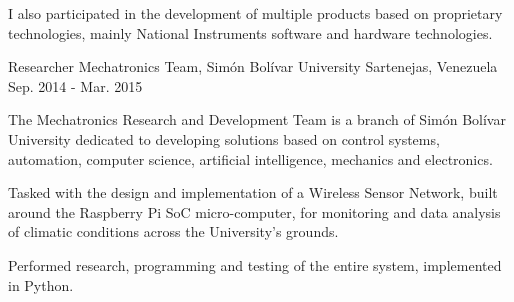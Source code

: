 \begin{cventries}
{\begin{cvitems}
        \item {I also participated in the development of multiple products based on proprietary technologies, mainly National Instruments software and hardware technologies.}
      \end{cvitems} 
    }
  \cventry
    {Researcher}
    {Mechatronics Team, Sim\'on Bol\'ivar University}
    {Sartenejas, Venezuela}
    {Sep. 2014 - Mar. 2015}
    {
    The Mechatronics Research and Development Team is a branch of Sim\'on Bol\'ivar University dedicated to developing solutions based on control systems, automation, computer science, artificial intelligence, mechanics and electronics.\vspace{4mm}
      \begin{cvitems}
        \item {Tasked with the design and implementation of a Wireless Sensor Network, built around the Raspberry Pi SoC micro-computer, for monitoring and data analysis of climatic conditions across the University's grounds.}
        \item {Performed research, programming and testing of the entire system, implemented in Python.}
      \end{cvitems}
    }
\end{cventries}
